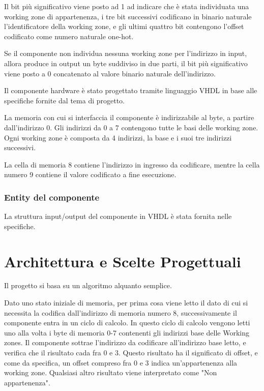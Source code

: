 \documentclass{article}
\begin{document}
 Il bit più significativo viene posto ad 1 ad indicare che è stata individuata una working zone di appartenenza, i tre bit successivi codificano in binario naturale l'identificatore della working zone, e gli ultimi quattro bit contengono l'offset codificato come numero naturale one-hot.

Se il componente non individua nessuna working zone per l'indirizzo in input, allora produce in output un byte suddiviso in due parti, il bit più significativo viene posto a 0 concatenato al valore binario naturale dell'indirizzo.

Il componente hardware è stato progettato tramite linguaggio VHDL in base alle specifiche fornite dal tema di progetto.

La memoria con cui si interfaccia il componente è indirizzabile al byte, a partire dall'indirizzo 0. Gli indirizzi da 0 a 7 contengono tutte le basi delle working zone. Ogni working zone è composta da 4 indirizzi, la base e i suoi tre indirizzi successivi.

La cella di memoria 8 contiene l'indirizzo in ingresso da codificare, mentre la cella numero 9 contiene il valore codificato a fine esecuzione.

\subsubsection{Entity del componente}

La struttura input/output del componente in VHDL è stata fornita nelle specifiche.




\section{Architettura e Scelte Progettuali}

Il progetto si basa su un algoritmo alquanto semplice.

Dato uno stato iniziale di memoria, per prima cosa viene letto il dato di cui si necessita la codifica dall'indirizzo di memoria numero 8, successivamente il componente entra in un ciclo di calcolo. In questo ciclo di calcolo vengono letti uno alla volta i byte di memoria 0-7 contenenti gli indirizzi base delle Working zones. Il componente sottrae l'indirizzo da codificare all'indirizzo base letto, e verifica che il risultato cada fra 0 e 3. Questo risultato ha il significato di offset, e come da specifica, un offset compreso fra 0 e 3 indica un'appartenenza alla working zone. Qualsiasi altro risultato viene interpretato come "Non appartenenza".
\end{document}

